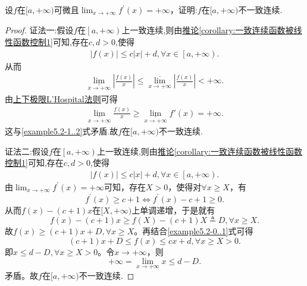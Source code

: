 \documentclass[../../main.tex]{subfiles}%
\begin{document}
\begin{proposition}[函数爆炸一定不一致连续]\label{proposition:函数爆炸一定不一致连续}
设\(f\)在\([a,+\infty)\)可微且\(\lim_{x\rightarrow +\infty}f^{\prime}(x)= +\infty\)，证明:\(f\)在\([a,+\infty)\)不一致连续.
\end{proposition}
\begin{proof}

{\color{blue}证法一:}假设$f$在$\left[ a,+\infty \right) $上一致连续,则由\hyperref[corollary:一致连续函数被线性函数控制1]{推论\ref{corollary:一致连续函数被线性函数控制1}}可知,存在$c,d>0$,使得
\begin{align}
\left| f\left( x \right) \right|\leqslant c\left| x \right|+d,\forall x\in \left[ a,+\infty \right) .\label{example5.2-1..1}
\end{align}
从而
\begin{align}\label{example5.2-1..2}
\underset{x\rightarrow +\infty}{\underline{\lim }}\left| \frac{f\left( x \right)}{x} \right|\leqslant \underset{x\rightarrow +\infty}{\overline{\lim }}\left| \frac{f\left( x \right)}{x} \right|<+\infty .
\end{align}
由\hyperref[theorem:上下极限L'Hospital法则]{上下极限L'Hospital法则}可得
\begin{align*}
\underset{x\rightarrow +\infty}{\underline{\lim }}\frac{f\left( x \right)}{x}\geqslant \underset{x\rightarrow +\infty}{\underline{\lim }}f'\left( x \right) =+\infty .
\end{align*}
这与\eqref{example5.2-1..2}式矛盾.故\(f\)在\([a,+\infty)\)不一致连续.

{\color{blue}证法二:}假设$f$在$\left[ a,+\infty \right) $上一致连续,则由\hyperref[corollary:一致连续函数被线性函数控制1]{推论\ref{corollary:一致连续函数被线性函数控制1}}可知,存在$c,d>0$,使得
\begin{align}
\left| f\left( x \right) \right|\leqslant c\left| x \right|+d,\forall x\in \left[ a,+\infty \right) .\label{example5.2-0..1}
\end{align}
由\(\lim_{x\rightarrow +\infty}f^\prime(x) = +\infty\)可知，存在\(X > 0\)，使得对\(\forall x\geqslant X\)，有
\[
f^\prime(x) \geqslant c + 1 \Leftrightarrow f^\prime(x) - c + 1 \geqslant 0.
\]
从而\(f(x) - (c + 1)x\)在\([X, +\infty)\)上单调递增，于是就有
\[
f(x) - (c + 1)x \geqslant f(X) - (c + 1)X \triangleq D, \forall x\geqslant X.
\]
故\(f(x) \geqslant (c + 1)x + D, \forall x\geqslant X\)。再结合\eqref{example5.2-0..1}式可得
\[
(c + 1)x + D \leqslant f(x) \leqslant cx + d, \forall x\geqslant X > 0.
\]
即\(x \leqslant d - D, \forall x\geqslant X > 0\)。令\(x\rightarrow +\infty\)，则
\[
+\infty = \lim_{x\rightarrow +\infty}x \leqslant d - D.
\]
矛盾。故\(f\)在\([a,+\infty)\)不一致连续.
\end{proof}
\end{document}
